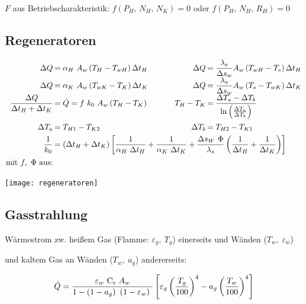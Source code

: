 	 $ F $ aus Betriebscharakteristik: $ f(P_H, \,N_H, \,N_K) = 0 $ oder $ f(P_H, \,N_H, \,R_H) = 0 $

\clearpage
\subsection{Regeneratoren}
	\[ \arraycolsep=0.1em  \def\arraystretch{1.6}
	\begin{array}{r l p{3em} r l}
		\Delta Q                                      & = \alpha_H\ A_w  \left(T_H - T_{wH}\right) \Delta t_H  &  & \Delta Q      & = \dfrac{\lambda_s}{\Delta s_w} A_w \left(T_{wH} - T_s\right) \Delta t_H                  \\
		\Delta Q                                      & = \alpha_K\ A_w  \left(T_{wK} - T_K\right) \Delta t_K  &  & \Delta Q      & = \dfrac{\lambda_s}{\Delta s_w} A_w \left(T_s - T_{wK}\right) \Delta t_K                  \\
		\dfrac{\Delta Q}{\Delta t_{H} + \Delta t_{K}} & = \dot{Q} = f\ k_0\ A _{w} \left( T_{H} - T_{K}\right) &  & T_{H} - T_{K} & = \dfrac{\Delta T_{a} - \Delta T_{b}}{\ln \left(\frac{\Delta T_{a}}{\Delta T_{b}}\right)} \\
		\Delta T_{a}                                  & = T_{H1} - T_{K2}                                      &  & \Delta T_{b}  & = T_{H2} - T_{K1} \\
		\dfrac{1}{k_0} & \multicolumn{4}{l}{= \left(\Delta t_{H} + \Delta t_{K}\right)  \left[\dfrac{1}{\alpha_{H}\ \Delta t_{H}} + \dfrac{1}{\alpha_{K}\ \Delta t_{K}} + \dfrac{\Delta s_{W}\ \Phi}{\lambda_{s}}  \left(\dfrac{1}{\Delta t_{H}}+\dfrac{1}{\Delta t_{K}}\right) \right]} \\
		 \text{mit } f,\ \Phi \text{ aus:}
	\end{array}\]


	\texttt{[image: regeneratoren]}
\subsection{Gasstrahlung}
	Wärmestrom zw. heißem Gas (Flamme: $ \varepsilon_g,\ T_g $) einerseits und Wänden ($ T_w,\ \varepsilon_w $)

	und kaltem Gas an Wänden ($ T_w,\ a_g $) andererseits:

	\skipabove{0pt}
	\[ \dot{Q} = \dfrac{\varepsilon_w\ \Cs\ A_w}{1-\left(1-a_g\right)\ (1-\varepsilon_w)\ } \left[ \varepsilon_g \left( \dfrac{T_g}{100} \right)^4 - a_g \left( \dfrac{T_w}{100} \right)^4 \right] \]

